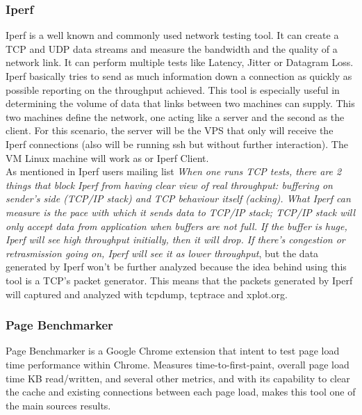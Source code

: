 \subsubsection{Iperf}
Iperf is a well known and commonly used network testing tool. It can create a
TCP and UDP data streams and measure the bandwidth and the quality of a network
link. It can perform multiple tests like Latency, Jitter or Datagram Loss.\\

Iperf basically tries to send as much information down a connection as quickly
as possible reporting on the throughput achieved. This tool is especially useful
in determining the volume of data that links between two machines can supply.
This two machines define the network, one acting like a server and the second as
the client. For this scenario, the server will be the VPS that only will receive
the Iperf connections (also will be running ssh but without further
interaction). The VM Linux machine will work as or Iperf Client.\\  

As mentioned in Iperf users mailing list \textit{
When one runs TCP tests, there are 2 things that block Iperf from having clear
view of real throughput: buffering on sender's side (TCP/IP stack) and TCP
behaviour itself (acking). What Iperf can measure is the pace with which it
sends data to TCP/IP stack; TCP/IP stack will only accept data from application
when buffers are not full. If the buffer is huge, Iperf will see high
throughput initially, then it will drop. If there's congestion or retrasmission
going on, Iperf will see it as lower throughput}\cite{iperfmaillist}, but the
data generated by Iperf won't be further analyzed because the  idea behind using
this tool is a TCP's packet generator. This means that the packets generated by 
Iperf will captured and analyzed with tcpdump, tcptrace and xplot.org.\\

\subsubsection{Page Benchmarker}

Page Benchmarker is a Google Chrome extension that intent to test page load 
time performance within Chrome. Measures time-to-first-paint, overall page load 
time KB read/written, and several other metrics, and with its capability to 
clear the cache and existing connections between each page load, makes this 
tool one of the main sources results.\\

